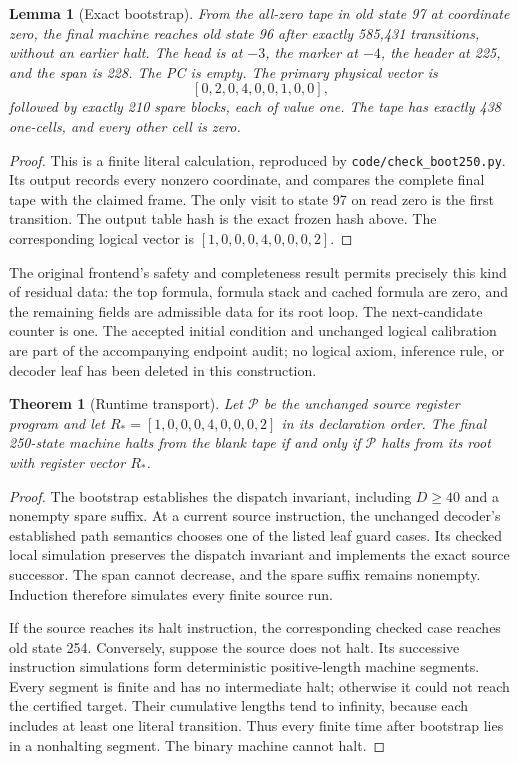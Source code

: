 \documentclass[11pt]{article}
\newtheorem{lemma}{Lemma}
\newtheorem{theorem}{Theorem}
\begin{document}
\begin{lemma}[Exact bootstrap]
From the all-zero tape in old state 97 at coordinate zero, the final
machine reaches old state 96 after exactly 585,431 transitions, without
an earlier halt.  The head is at $-3$, the marker at $-4$, the header at
225, and the span is 228.  The PC is empty.  The primary physical vector is
\[
 [0,2,0,4,0,0,1,0,0],
\]
followed by exactly 210 spare blocks, each of value one.  The tape has
exactly 438 one-cells, and every other cell is zero.
\end{lemma}
\begin{proof}
This is a finite literal calculation, reproduced by
\texttt{code/check\_boot250.py}.  Its output records every nonzero
coordinate, and compares the complete final tape with the claimed
frame.  The only visit to state 97 on read zero is the first transition.
The output table hash is the exact frozen hash above.  The corresponding
logical vector is $[1,0,0,0,4,0,0,0,2]$.
\end{proof}

The original frontend's safety and completeness result permits precisely
this kind of residual data: the top formula, formula stack and cached
formula are zero, and the remaining fields are admissible data for its
root loop.  The next-candidate counter is one.  The accepted initial
condition and unchanged logical calibration are part of the accompanying
endpoint audit; no logical axiom, inference rule, or decoder leaf has
been deleted in this construction.

\begin{theorem}[Runtime transport]
Let $\mathcal P$ be the unchanged source register program and let
$R_*=[1,0,0,0,4,0,0,0,2]$ in its declaration order.  The final 250-state
machine halts from the blank tape if and only if $\mathcal P$ halts from
its root with register vector $R_*$.
\end{theorem}
\begin{proof}
The bootstrap establishes the dispatch invariant, including $D\ge40$
and a nonempty spare suffix.  At a current source instruction, the
unchanged decoder's established path semantics chooses one of the
listed leaf guard cases.  Its checked local simulation preserves the
dispatch invariant and implements the exact source successor.  The
span cannot decrease, and the spare suffix remains nonempty.  Induction
therefore simulates every finite source run.

If the source reaches its halt instruction, the corresponding checked
case reaches old state 254.  Conversely, suppose the source does not
halt.  Its successive instruction simulations form deterministic
positive-length machine segments.  Every segment is finite and has no
intermediate halt; otherwise it could not reach the certified target.
Their cumulative lengths tend to infinity, because each includes at
least one literal transition.  Thus every finite time after bootstrap
lies in a nonhalting segment.  The binary machine cannot halt.
\end{proof}
\end{document}
